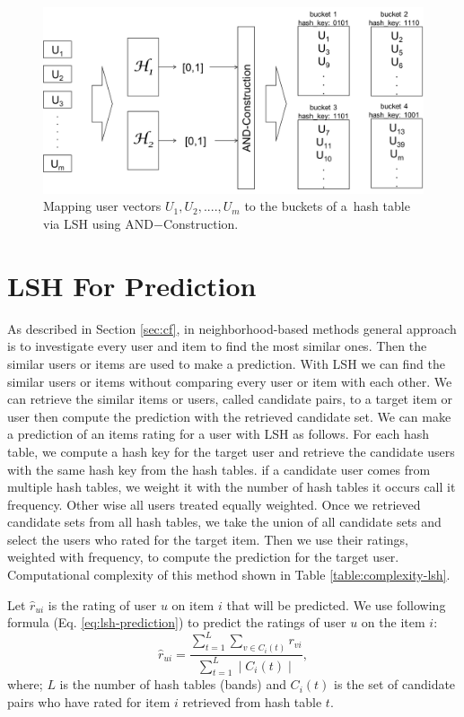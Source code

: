 \documentclass[conference]{IEEEtran}
\begin{document}
\begin{figure}[h]
   \center
   \includegraphics[scale=0.3]{lsh.png}
   \caption{Mapping user vectors ${U_1, U_2, ...., U_m}$ to the buckets of a\
   hash table via LSH using AND$-$Construction.}
   \label{fig:lsh-illustra}
\end{figure}


\section{LSH For Prediction}
\label{sec:lsh-prediction}
As described in Section \ref{sec:cf}, in neighborhood-based methods general 
approach is to investigate every user and item to find the most similar ones. 
Then the similar users or items are used to make a prediction. With LSH we can 
find the similar users or items without comparing every user or item with each other.
We can retrieve the similar items or users, called candidate pairs, to a target
item or user then compute the prediction with the retrieved candidate set. 
We can make a prediction of an items rating for a user with LSH as follows. For 
each hash table, we compute a hash key for the target user and retrieve the 
candidate users with the same hash key from the hash tables. if a candidate user
comes from multiple hash tables, we weight it with the number of hash tables 
it occurs call it frequency. Other wise all users treated equally weighted. Once we 
retrieved candidate sets from all hash tables, we take the union of all candidate 
sets and select the users who rated for the target item. Then we use their 
ratings, weighted with frequency, to compute the prediction for the target user.
Computational complexity of this method shown in Table \ref{table:complexity-lsh}.

Let $\hat{r}_{ui}$ is the rating of user $u$ on item $i$ that will be predicted.
We use following formula (Eq. \ref{eq:lsh-prediction}) to predict the ratings 
of user $u$ on the item $i$:
\begin{equation}
\hat{r}_{ui} = \frac{\sum\limits_{t=1}^{L} \sum\limits_{v \in C_i(t)} r_{vi}}{\sum\limits_{t=1}^{L} \mid C_i(t) \mid} ,
\label{eq:lsh-prediction}
\end{equation}
where; $L$ is the number of hash tables (bands) and  $C_i(t)$ is the set of 
candidate pairs who have rated for item $i$ retrieved from hash table $t$.
\end{document}
